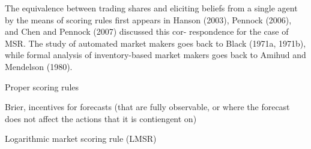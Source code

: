 The equivalence between trading shares and eliciting beliefs from a single agent by the means of scoring rules first appears in \cite{savage1971elicitation}
Hanson (2003), Pennock (2006), and Chen and Pennock (2007) discussed this cor- respondence for the case of MSR. The study of automated market makers goes back to Black (1971a, 1971b), while formal analysis of inventory-based market makers goes back to Amihud and Mendelson (1980).



Proper scoring rules

Brier, incentives for forecasts (that are fully observable, or where the forecast does not affect the actions that it is contiengent on)

Logarithmic market scoring rule (LMSR)




